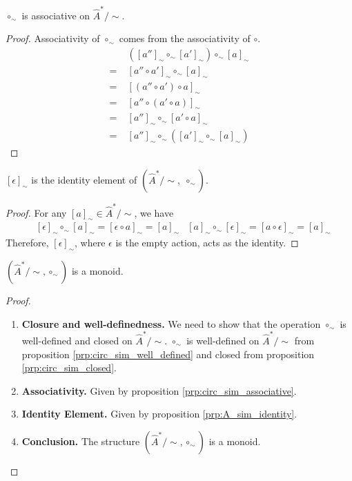 \begin{proposition}\label{prp:circ_sim_associative}
    $\circ_{\sim}$ is associative on $\hat{A}^{\ast}/\sim$.
\end{proposition}
\begin{proof}
Associativity of $\circ_{\sim}$ comes from the associativity of $\circ$.
\begin{align}
          & ([a'']_{\sim} \circ_{\sim} [a']_{\sim}) \circ_{\sim} [a]_{\sim} \\
      = \; & [a'' \circ a']_{\sim} \circ_{\sim} [a]_{\sim}                 \\
      = \; & [ (a'' \circ a') \circ a ]_{\sim}                               \\
      = \; & [ a'' \circ (a' \circ a) ]_{\sim}                               \\
      = \; & [a'']_{\sim} \circ_{\sim} [a' \circ a]_{\sim}                   \\
      = \; & [a'']_{\sim} \circ_{\sim} ([a']_{\sim} \circ_{\sim} [a]_{\sim})
  \end{align}
\end{proof}


\begin{proposition}\label{prp:A_sim_identity}
    $[\epsilon]_{\sim}$ is the identity element of $(\hat{A}^{\ast}/\sim, \; \circ_{\sim})$.
\end{proposition}
\begin{proof}
For any $[a]_{\sim} \in \hat{A}^{\ast}/\sim$, we have
\begin{align}
   & [\epsilon]_{\sim} \circ_{\sim} [a]_{\sim} = [\epsilon \circ a]_{\sim} = [a]_{\sim}
   & [a]_{\sim} \circ_{\sim} [\epsilon]_{\sim} = [a \circ \epsilon]_{\sim} = [a]_{\sim}
\end{align}
Therefore, $[\epsilon]_{\sim}$, where $\epsilon$ is the empty action, acts as the identity.
\end{proof}


\begin{proposition}
	$(\hat{A}^{\ast}/\sim, \circ_{\sim})$ is a monoid.
\end{proposition}
\begin{proof}
	\begin{enumerate}[(1)]
		\item \textbf{Closure and well-definedness.}
		      We need to show that the operation $\circ_{\sim}$ is well-defined and closed on $\hat{A}^{\ast}/\sim$.
		      $\circ_{\sim}$ is well-defined on $\hat{A}^{\ast}/\sim$ from proposition \ref{prp:circ_sim_well_defined} and closed from proposition \ref{prp:circ_sim_closed}.

		\item \textbf{Associativity.}
            Given by proposition \ref{prp:circ_sim_associative}.

		\item \textbf{Identity Element.}
		Given by proposition \ref{prp:A_sim_identity}.

		\item \textbf{Conclusion.}
		      The structure $(\hat{A}^{\ast}/\sim, \circ_{\sim})$ is a monoid.
	\end{enumerate}
\end{proof}

